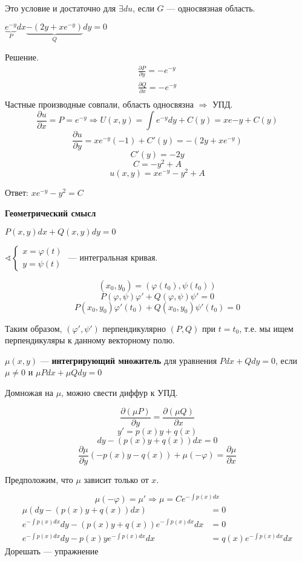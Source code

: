 Это условие и достаточно для $\exists du$, если $G$ --- односвязная область.

\begin{example}
    $\underbrace{e^{-y}}_{P}dx \underbrace{- (2y + xe^{-y})}_{Q} dy = 0$

    Решение.
    \begin{align*}
        \frac{\partial P}{\partial y} = -e^{-y} \\
        \frac{\partial Q}{\partial x} = -e^{-y} \\
    \end{align*}
    Частные производные совпали, область односвязна $\Rightarrow$ УПД.
    $$\frac{\partial u}{\partial x} = P = e^{-y} \Rightarrow U(x, y) = \int e^{-y} dy + C(y) = xe{-y} + C(y)$$
    $$\frac{\partial u}{\partial y} = xe^{-y} (-1) + C'(y) = -(2y + xe^{-y})$$
    $$C'(y) = -2y$$
    $$C = -y^2 + A$$
    $$u(x, y) = xe^{-y} - y^2 + A$$

    Ответ: $xe^{-y}-y^2=C$
\end{example}

\textbf{Геометрический смысл}

$P(x, y)dx + Q(x, y)dy = 0$

$\sphericalangle \begin{cases}
        x = \varphi(t) \\
        y = \psi(t)
    \end{cases}$ --- интегральная кривая.

$$(x_0, y_0) = (\varphi(t_0), \psi(t_0))$$
$$P(\varphi, \psi) \varphi' + Q(\varphi, \psi)\psi' = 0$$
$$P(x_0, y_0) \varphi'(t_0) + Q(x_0, y_0)\psi'(t_0) = 0$$

Таким образом, $(\varphi', \psi')$ перпендикулярно $(P, Q)$ при $t=t_0$, т.е. мы ищем перпендикуляры к данному векторному полю.

\begin{definition}
    $\mu(x, y)$ --- \textbf{интегрирующий множитель} для уравнения $Pdx+Qdy = 0$, если $\mu\not=0$ и $\mu Pdx + \mu Qdy = 0$
\end{definition}

Домножая на $\mu$, можно свести диффур к УПД.

$$\frac{\partial (\mu P)}{\partial y} = \frac{\partial (\mu Q)}{\partial x}$$
$$y' = p(x)y + q(x)$$
$$dy - (p(x)y + q(x))dx = 0$$
$$\frac{\partial \mu}{\partial y}(-p(x)y - q(x)) + \mu(-\varphi) = \frac{\partial \mu}{\partial x}$$

Предположим, что $\mu$ зависит только от $x$.

$$\mu(-\varphi) = \mu' \Rightarrow \mu = Ce^{-\int p(x)dx}$$
\begin{align*}
    \mu(dy - (p(x)y + q(x))dx)                              & = 0                       \\
    e^{-\int p(x)dx} dy - (p(x)y + q(x))e^{-\int p(x)dx} dx & = 0                       \\
    e^{-\int p(x)dx} dy - p(x)ye^{-\int p(x)dx} dx          & = q(x)e^{-\int p(x)dx} dx
\end{align*}
Дорешать --- упражнение

